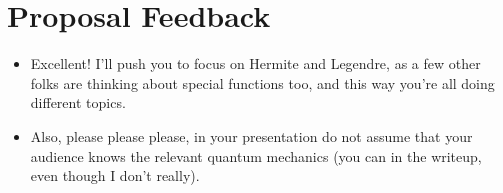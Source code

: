 \documentclass[../finalProject.tex]{subfiles}
\begin{document}
\section*{Proposal Feedback}
\begin{itemize}
    \item {}Excellent! I'll push you to focus on Hermite and Legendre, as a few other folks are thinking about special functions too, and this way you're all doing different topics.
    \item Also, please please please, in your presentation do not assume that your audience knows the relevant quantum mechanics (you can in the writeup, even though I don't really).
\end{itemize}
\end{document}
